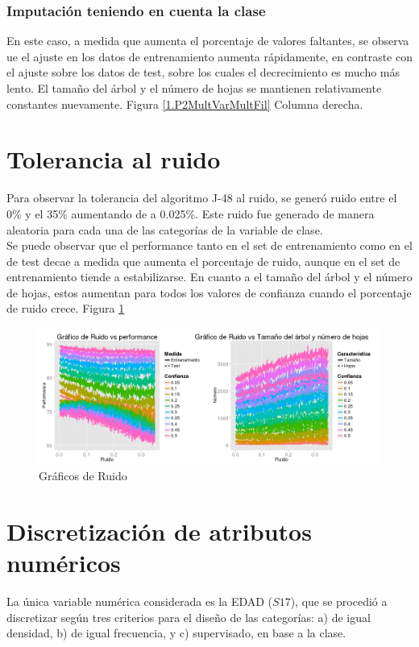 \documentclass[]{article}
\begin{document}
\subsubsection{Imputación teniendo en cuenta la clase}
En este caso, a medida que aumenta el porcentaje de valores faltantes, se observa ue el ajuste en los datos de entrenamiento aumenta rápidamente, en contraste con el ajuste sobre los datos de test, sobre los cuales el decrecimiento es mucho más lento. El tamaño del árbol y el número de hojas se mantienen relativamente constantes nuevamente. Figura \ref{1.P2MultVarMultFil} Columna derecha.

\section{Tolerancia al ruido}
Para observar la tolerancia del algoritmo J-48 al ruido, se generó ruido entre el 0\% y el 35\% aumentando de a 0.025\%. Este ruido fue generado de manera aleatoria para cada una de las categorías de la variable de clase. \\

Se puede observar que el performance tanto en el set de entrenamiento como en el de test decae a medida que aumenta el porcentaje de ruido, aunque en el set de entrenamiento tiende a estabilizarse. En cuanto a el tamaño del árbol y el número de hojas, estos aumentan para todos los valores de confianza cuando el porcentaje de ruido crece. Figura \ref{3.P3Ruido}

\begin{figure}[H]
	\includegraphics[scale = 0.38]{3_1_Ruido}
	\caption[Ruido]{Gráficos de Ruido}
	\label{3.P3Ruido}
\end{figure}


\section{Discretización de atributos numéricos}
La única variable numérica considerada es la EDAD ($S17$), que se procedió a discretizar según tres criterios para el diseño de las categorías: a) de igual densidad, b) de igual frecuencia, y c) supervisado, en base a la clase.
\end{document}
